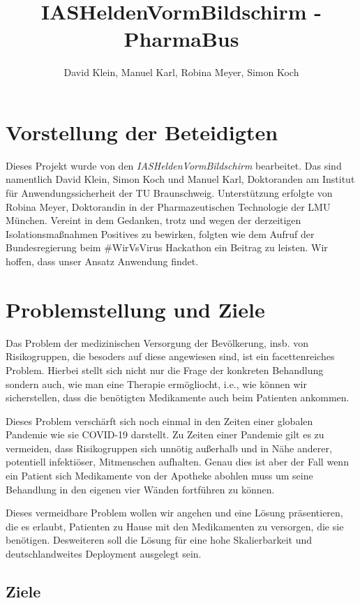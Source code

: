 \documentclass[a4]{article}
\title{IASHeldenVormBildschirm - PharmaBus}
\author{David Klein, Manuel Karl, Robina Meyer, Simon Koch}
\begin{document}
\maketitle


\section{Vorstellung der Beteidigten}
Dieses Projekt wurde von den \textit{IASHeldenVormBildschirm} bearbeitet. Das sind namentlich David Klein, Simon Koch und Manuel Karl, Doktoranden am Institut für Anwendungssicherheit der TU Braunschweig. Unterstützung erfolgte von Robina Meyer, Doktorandin in der Pharmazeutischen Technologie der LMU München. Vereint in dem Gedanken, trotz und wegen der derzeitigen Isolationsmaßnahmen Positives zu bewirken, folgten wie dem Aufruf der Bundesregierung beim \#WirVsVirus Hackathon ein Beitrag zu leisten. Wir hoffen, dass unser Ansatz Anwendung findet.


\section{Problemstellung und Ziele}

Das Problem der medizinischen Versorgung der Bevölkerung, insb. von Risikogruppen, die besoders auf diese angewiesen sind, ist ein facettenreiches Problem.
Hierbei stellt sich nicht nur die Frage der konkreten Behandlung sondern auch, wie man eine Therapie ermögliocht, i.e., wie können wir sicherstellen, dass die benötigten Medikamente auch beim Patienten ankommen.

Dieses Problem verschärft sich noch einmal in den Zeiten einer globalen Pandemie wie sie COVID-19 darstellt. Zu Zeiten einer Pandemie gilt es zu vermeiden, dass Risikogruppen sich unnötig außerhalb und in Nähe anderer, potentiell infektiöser, Mitmenschen aufhalten. Genau dies ist aber der Fall wenn ein Patient sich Medikamente von der Apotheke abohlen muss um seine Behandlung in den eigenen vier Wänden fortführen zu können.

Dieses vermeidbare Problem wollen wir angehen und eine Lösung präsentieren, die es erlaubt, Patienten zu Hause mit den Medikamenten zu versorgen, die sie benötigen. Desweiteren soll die Lösung für eine hohe Skalierbarkeit und deutschlandweites Deployment ausgelegt sein.

\subsection{Ziele}
\end{document}
